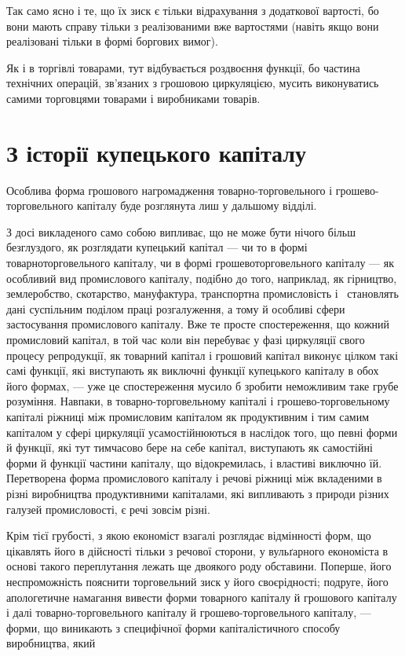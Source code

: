 
Так само ясно і те, що їх зиск є тільки відрахування з додаткової
вартості, бо вони мають справу тільки з реалізованими
вже вартостями (навіть якщо вони реалізовані тільки в формі
боргових вимог).

Як і в торгівлі товарами, тут відбувається роздвоєння функції,
бо частина технічних операцій, зв’язаних з грошовою циркуляцією,
мусить виконуватись самими торговцями товарами
і виробниками товарів.

\section{З історії купецького капіталу}

Особлива форма грошового нагромадження товарно-торговельного
і грошево-торговельного капіталу буде розглянута лиш у
дальшому відділі.

З досі викладеного само собою випливає, що не може бути
нічого більш безглуздого, як розглядати купецький капітал —
чи то в формі товарно\dash{}торговельного капіталу, чи в формі грошево\dash{}торговельного
капіталу — як особливий вид промислового
капіталу, подібно до того, наприклад, як гірництво, землеробство,
скотарство, мануфактура, транспортна промисловість і~
становлять дані суспільним поділом праці розгалуження, а тому й
особливі сфери застосування промислового капіталу. Вже те
просте спостереження, що кожний промисловий капітал, в той час
коли він перебуває у фазі циркуляції свого процесу репродукції,
як товарний капітал і грошовий капітал виконує цілком такі
самі функції, які виступають як виключні функції купецького
капіталу в обох його формах, — уже це спостереження мусило б
зробити неможливим таке грубе розуміння. Навпаки, в товарно-торговельному
капіталі і грошево-торговельному капіталі ріжниці
між промисловим капіталом як продуктивним і тим самим
капіталом у сфері циркуляції усамостійнюються в наслідок того,
що певні форми й функції, які тут тимчасово бере на себе капітал,
виступають як самостійні форми й функції частини капіталу,
що відокремилась, і властиві виключно їй. Перетворена форма
промислового капіталу і речові ріжниці між вкладеними в різні
виробництва продуктивними капіталами, які випливають з природи
різних галузей промисловості, є речі зовсім різні.

Крім тієї грубості, з якою економіст взагалі розглядає відмінності
форм, що цікавлять його в дійсності тільки з речової сторони,
у вульґарного економіста в основі такого переплутання
лежать ще двоякого роду обставини. Поперше, його неспроможність
пояснити торговельний зиск у його своєрідності; подруге,
його апологетичне намагання вивести форми товарного капіталу
й грошового капіталу і далі товарно-торговельного капіталу й
грошево-торговельного капіталу, — форми, що виникають з специфічної
форми капіталістичного способу виробництва, який
\parbreak{}  %
